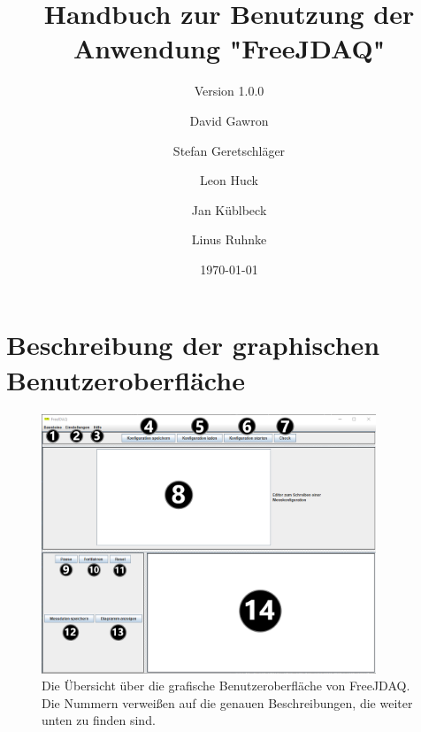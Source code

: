 \documentclass[parskip=full]{scrartcl}
\title{Handbuch zur Benutzung der Anwendung "FreeJDAQ"}
\subtitle{Version 1.0.0}
\author{David Gawron \and Stefan Geretschläger \and Leon Huck \and Jan Küblbeck \and Linus Ruhnke}
\date{\today}
\begin{document}
\maketitle

\clearpage
\tableofcontents 					%

 \clearpage

\section{Beschreibung der graphischen Benutzeroberfläche}

\begin{figure}[htbp]
    \begin{center}
        \includegraphics[width = 10cm]{Grafiken/Uebersicht_GUI_Mit_Nummern.png}
        \caption{Die Übersicht über die grafische Benutzeroberfläche von FreeJDAQ. Die Nummern verweißen auf die genauen Beschreibungen, die weiter unten zu finden sind.}
        \label{Uebersicht_GUI_Mit_Nummern}
    \end{center}
\end{figure}
\end{document}
